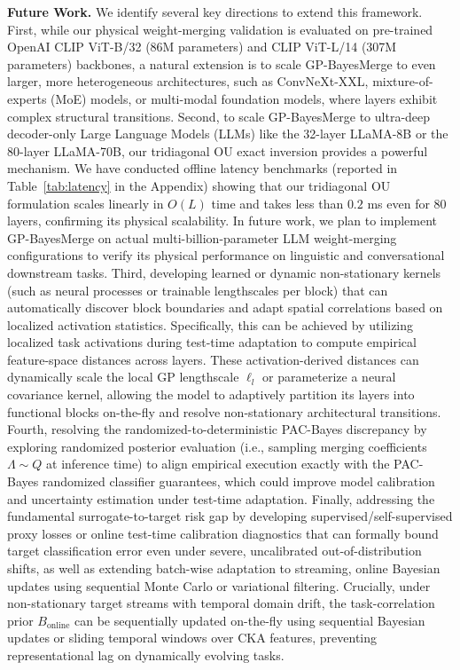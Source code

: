 \textbf{Future Work.} We identify several key directions to extend this
framework. First, while our physical weight-merging validation is evaluated on
pre-trained OpenAI CLIP ViT-B/32 (86M parameters) and CLIP ViT-L/14 (307M parameters)
backbones, a natural extension is to scale GP-BayesMerge to even larger, more
heterogeneous architectures, such as ConvNeXt-XXL, mixture-of-experts (MoE)
models, or multi-modal foundation models, where layers exhibit complex
structural transitions. Second, to scale GP-BayesMerge to ultra-deep
decoder-only Large Language Models (LLMs) like the 32-layer LLaMA-8B or the
80-layer LLaMA-70B, our tridiagonal OU exact inversion provides a powerful
mechanism. We have conducted offline latency benchmarks (reported in Table~\ref{tab:latency} in the Appendix)
showing that our tridiagonal OU formulation scales linearly in $O(L)$ time and
takes less than $0.2$ ms even for $80$ layers, confirming its physical
scalability. In future work, we plan to implement GP-BayesMerge on actual
multi-billion-parameter LLM weight-merging configurations to verify its physical
performance on linguistic and conversational downstream tasks. Third, developing
learned or dynamic non-stationary kernels (such as neural processes or trainable
lengthscales per block) that can automatically discover block boundaries and
adapt spatial correlations based on localized activation statistics.
Specifically, this can be achieved by utilizing localized task activations
during test-time adaptation to compute empirical feature-space distances across
layers. These activation-derived distances can dynamically scale the local GP
lengthscale $\ell_l$ or parameterize a neural covariance kernel, allowing the
model to adaptively partition its layers into functional blocks on-the-fly and
resolve non-stationary architectural transitions. Fourth, resolving the
randomized-to-deterministic PAC-Bayes discrepancy by exploring randomized
posterior evaluation (i.e., sampling merging coefficients $\Lambda \sim Q$ at
inference time) to align empirical execution exactly with the PAC-Bayes
randomized classifier guarantees, which could improve model calibration and
uncertainty estimation under test-time adaptation. Finally, addressing the
fundamental surrogate-to-target risk gap by developing
supervised/self-supervised proxy losses or online test-time calibration
diagnostics that can formally bound target classification error even under
severe, uncalibrated out-of-distribution shifts, as well as extending batch-wise
adaptation to streaming, online Bayesian updates using sequential Monte Carlo or
variational filtering. Crucially, under non-stationary target streams with temporal domain drift, the task-correlation prior $B_{\text{online}}$ can be sequentially updated on-the-fly using sequential Bayesian updates or sliding temporal windows over CKA features, preventing representational lag on dynamically evolving tasks.

